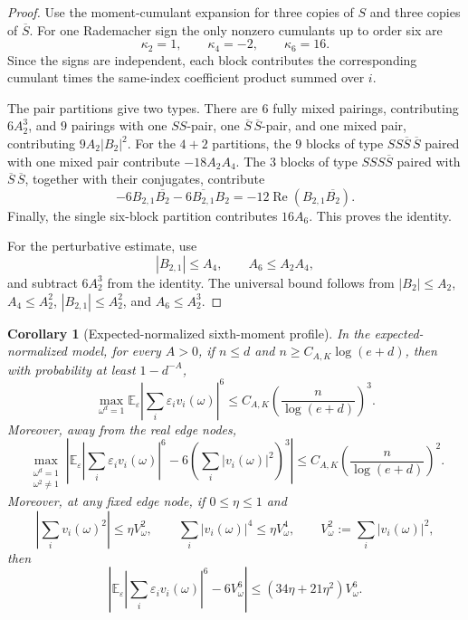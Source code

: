 \documentclass[11pt]{amsart}
\numberwithin{equation}{section}
\newtheorem{corollary}[theorem]{Corollary}
\theoremstyle{definition}
\theoremstyle{remark}
\newcommand{\Exp}{\mathbb E}
\newcommand{\eps}{\varepsilon}
\begin{document}
\begin{proof}
Use the moment-cumulant expansion for three copies of \(S\) and three copies of
\(\overline S\).  For one Rademacher sign the only nonzero cumulants up to order
six are
\[
  \kappa_2=1,\qquad \kappa_4=-2,\qquad \kappa_6=16.
\]
Since the signs are independent, each block contributes the corresponding
cumulant times the same-index coefficient product summed over \(i\).

The pair partitions give two types.  There are \(6\) fully mixed pairings,
contributing \(6A_2^3\), and \(9\) pairings with one \(SS\)-pair, one
\(\overline S\,\overline S\)-pair, and one mixed pair, contributing
\(9A_2|B_2|^2\).  For the \(4+2\) partitions, the \(9\) blocks of type
\(SS\overline S\,\overline S\) paired with one mixed pair contribute
\(-18A_2A_4\).  The \(3\) blocks of type \(SSS\overline S\) paired with
\(\overline S\,\overline S\), together with their conjugates, contribute
\[
  -6B_{2,1}\overline{B_2}-6\overline{B_{2,1}}B_2
  =-12\operatorname{Re}(B_{2,1}\overline{B_2}).
\]
Finally, the single six-block partition contributes \(16A_6\).  This proves the
identity.

For the perturbative estimate, use
\[
  |B_{2,1}|\le A_4,\qquad A_6\le A_2A_4,
\]
and subtract \(6A_2^3\) from the identity.  The universal bound follows from
\(|B_2|\le A_2\), \(A_4\le A_2^2\), \(|B_{2,1}|\le A_2^2\), and
\(A_6\le A_2^3\).
\end{proof}

\begin{corollary}[Expected-normalized sixth-moment profile]
\label{cor:expected-sixth-profile}
In the expected-normalized model, for every \(A>0\), if \(n\le d\) and
\(n\ge C_{A,K}\log(e+d)\), then with probability at least \(1-d^{-A}\),
\[
  \max_{\omega^d=1}
  \Exp_\eps\left|\sum_i\eps_i v_i(\omega)\right|^6
  \le C_{A,K}\left(\frac{n}{\log(e+d)}\right)^3 .
\]
Moreover, away from the real edge nodes,
\[
  \max_{\substack{\omega^d=1\\ \omega^2\ne1}}
  \left|
  \Exp_\eps\left|\sum_i\eps_i v_i(\omega)\right|^6
  -6\left(\sum_i|v_i(\omega)|^2\right)^3
  \right|
  \le C_{A,K}\left(\frac{n}{\log(e+d)}\right)^2 .
\]
Moreover, at any fixed edge node, if \(0\le\eta\le1\) and
\[
  \left|\sum_i v_i(\omega)^2\right|\le \eta V_\omega^2,
  \qquad
  \sum_i|v_i(\omega)|^4\le \eta V_\omega^4,
  \qquad
  V_\omega^2:=\sum_i|v_i(\omega)|^2,
\]
then
\[
  \left|
  \Exp_\eps\left|\sum_i\eps_i v_i(\omega)\right|^6
  -6V_\omega^6
  \right|
  \le (34\eta+21\eta^2)V_\omega^6 .
\]
\end{corollary}
\end{document}
